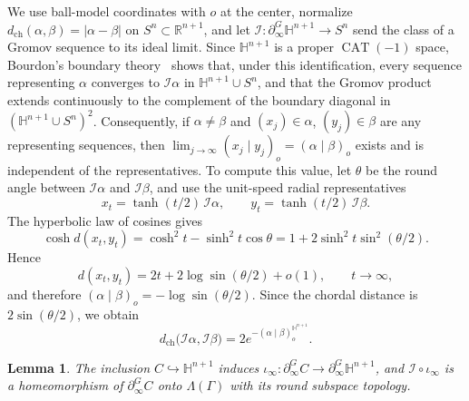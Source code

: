 \documentclass[12pt,oneside,a4paper]{article}
\theoremstyle{mytheorem}
\newtheorem{lemma}[definition]{Lemma}
\theoremstyle{remark}
\theoremstyle{definition}
\begin{document}
We use ball-model coordinates with \(o\) at the center, normalize
\(d_{\mathrm{ch}}(\alpha,\beta)=|\alpha-\beta|\) on
\(S^n\subset\mathbb R^{n+1}\), and let
\(\mathcal I\colon\partial_\infty^{G}\mathbb H^{n+1}\to S^n\) send the
class of a Gromov sequence to its ideal limit. Since
\(\mathbb H^{n+1}\) is a proper \(\operatorname{CAT}(-1)\) space, Bourdon's
boundary theory~\cite[\S\S~1.4 and~2.4--2.5]{MR1341941} shows that, under
this identification, every sequence representing \(\alpha\) converges to
\(\mathcal I\alpha\) in \(\mathbb H^{n+1}\cup S^n\), and that the Gromov
product extends continuously to the complement of the boundary diagonal in
\((\mathbb H^{n+1}\cup S^n)^2\).
Consequently, if
\(\alpha\neq\beta\) and \((x_j)\in\alpha\), \((y_j)\in\beta\) are any
representing sequences, then
\(\lim_{j\to\infty}(x_j\mid y_j)_o=(\alpha\mid\beta)_o\)
exists and is independent of the representatives. To compute this value, let
\(\theta\) be the round angle between \(\mathcal I\alpha\) and
\(\mathcal I\beta\), and use the unit-speed radial representatives
\[
x_t=\tanh(t/2)\,\mathcal I\alpha,
\qquad
y_t=\tanh(t/2)\,\mathcal I\beta.
\]
The hyperbolic law of cosines gives
\[
\cosh d(x_t,y_t)
=\cosh^2t-\sinh^2t\cos\theta
=1+2\sinh^2t\sin^2(\theta/2).
\]
Hence
\[
d(x_t,y_t)=2t+2\log\sin(\theta/2)+o(1),
\qquad t\to\infty,
\]
and therefore
\((\alpha\mid\beta)_o=-\log\sin(\theta/2)\). Since the chordal distance is
\(2\sin(\theta/2)\), we obtain
\begin{equation}\label{eq:chordal-gromov-product}
 d_{\mathrm{ch}}\bigl(\mathcal I\alpha,\mathcal I\beta\bigr)
 =2e^{-(\alpha\mid\beta)^{\mathbb H^{n+1}}_o} .
\end{equation}




\begin{lemma}\label{lem:boundary}
The inclusion \(C\hookrightarrow\mathbb H^{n+1}\) induces
\(\iota_\infty\colon\partial_\infty^{G}C\to
\partial_\infty^{G}\mathbb H^{n+1}\), and \(\mathcal I\circ\iota_\infty\)
is a homeomorphism of \(\partial_\infty^{G}C\) onto \(\Lambda(\Gamma)\)
with its round subspace topology.
\end{lemma}
\end{document}
